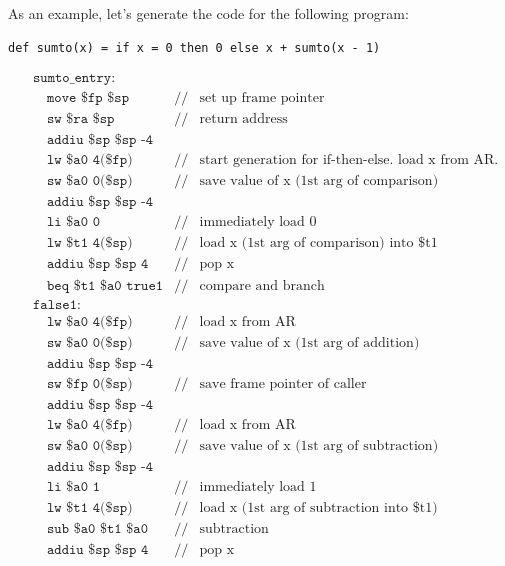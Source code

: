 As an example, let's generate the code for the following program:
\begin{lstlisting}
def sumto(x) = if x = 0 then 0 else x + sumto(x - 1)
\end{lstlisting}
\begin{align*}
&\texttt{sumto\_entry:}&&\\
&\quad\texttt{move \$fp \$sp}&//&\text{set up frame pointer}\\
&\quad\texttt{sw \$ra \$sp}&//&\text{return address}\\
&\quad\texttt{addiu \$sp \$sp -4}&&\\
&\quad\texttt{lw \$a0 4(\$fp)}&//&\text{start generation for if-then-else. load x from AR.}\\
&\quad\texttt{sw \$a0 0(\$sp)}&//&\text{save value of x (1st arg of comparison)}\\
&\quad\texttt{addiu \$sp \$sp -4}&&\\
&\quad\texttt{li \$a0 0}&//&\text{immediately load 0}\\
&\quad\texttt{lw \$t1 4(\$sp)}&//&\text{load x (1st arg of comparison) into \$t1}\\
&\quad\texttt{addiu \$sp \$sp 4}&//&\text{pop x}\\
&\quad\texttt{beq \$t1 \$a0 true1}&//&\text{compare and branch}\\
&\texttt{false1:}&&\\
&\quad\texttt{lw \$a0 4(\$fp)}&//&\text{load x from AR}\\
&\quad\texttt{sw \$a0 0(\$sp)}&//&\text{save value of x (1st arg of addition)}\\
&\quad\texttt{addiu \$sp \$sp -4}&&\\
&\quad\texttt{sw \$fp 0(\$sp)}&//&\text{save frame pointer of caller}\\
&\quad\texttt{addiu \$sp \$sp -4}&&\\
&\quad\texttt{lw \$a0 4(\$fp)}&//&\text{load x from AR}\\
&\quad\texttt{sw \$a0 0(\$sp)}&//&\text{save value of x (1st arg of subtraction)}\\
&\quad\texttt{addiu \$sp \$sp -4}&&\\
&\quad\texttt{li \$a0 1}&//&\text{immediately load 1}\\
&\quad\texttt{lw \$t1 4(\$sp)}&//&\text{load x (1st arg of subtraction into \$t1)}\\
&\quad\texttt{sub \$a0 \$t1 \$a0}&//&\text{subtraction}\\
&\quad\texttt{addiu \$sp \$sp 4}&//&\text{pop x}\\

\end{align*}
